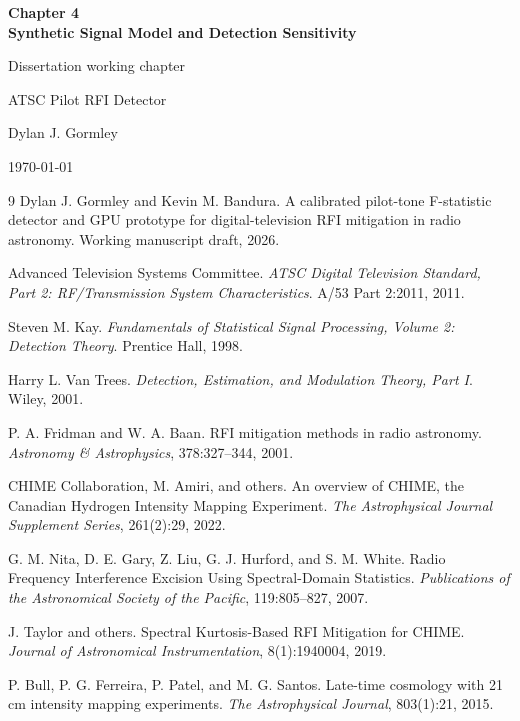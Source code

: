 \documentclass[11pt,oneside]{report}
\begin{document}
\begin{titlepage}
\centering
\vspace*{1.2in}
{\Huge\bfseries Chapter 4\\[0.3em] Synthetic Signal Model and Detection Sensitivity\par}
\vspace{0.6in}
{\Large Dissertation working chapter\par}
\vspace{0.3in}
{\large ATSC Pilot RFI Detector\par}
\vfill
{\large Dylan J. Gormley\par}
{\large \today\par}
\end{titlepage}

\tableofcontents
\listoffigures
\listoftables
\clearpage

\setcounter{chapter}{3}



\begin{thebibliography}{9}
Dylan J. Gormley and Kevin M. Bandura.
\newblock A calibrated pilot-tone F-statistic detector and GPU prototype for digital-television RFI mitigation in radio astronomy.
\newblock Working manuscript draft, 2026.

Advanced Television Systems Committee.
\newblock \emph{ATSC Digital Television Standard, Part 2: RF/Transmission System Characteristics}.
\newblock A/53 Part 2:2011, 2011.

Steven M. Kay.
\newblock \emph{Fundamentals of Statistical Signal Processing, Volume 2: Detection Theory}.
\newblock Prentice Hall, 1998.

Harry L. Van Trees.
\newblock \emph{Detection, Estimation, and Modulation Theory, Part I}.
\newblock Wiley, 2001.

P. A. Fridman and W. A. Baan.
\newblock RFI mitigation methods in radio astronomy.
\newblock \emph{Astronomy \& Astrophysics}, 378:327--344, 2001.

CHIME Collaboration, M. Amiri, and others.
\newblock An overview of CHIME, the Canadian Hydrogen Intensity Mapping Experiment.
\newblock \emph{The Astrophysical Journal Supplement Series}, 261(2):29, 2022.

G. M. Nita, D. E. Gary, Z. Liu, G. J. Hurford, and S. M. White.
\newblock Radio Frequency Interference Excision Using Spectral-Domain Statistics.
\newblock \emph{Publications of the Astronomical Society of the Pacific}, 119:805--827, 2007.

J. Taylor and others.
\newblock Spectral Kurtosis-Based RFI Mitigation for CHIME.
\newblock \emph{Journal of Astronomical Instrumentation}, 8(1):1940004, 2019.

P. Bull, P. G. Ferreira, P. Patel, and M. G. Santos.
\newblock Late-time cosmology with 21 cm intensity mapping experiments.
\newblock \emph{The Astrophysical Journal}, 803(1):21, 2015.
\end{thebibliography}
\end{document}
